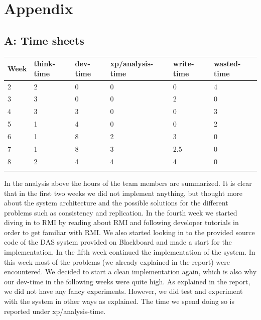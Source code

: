 \section{Appendix}

\subsection{A: Time sheets}

\begin{table}[h]
\begin{tabular}{llllll}
\textbf{Week} & \textbf{think-time} & \textbf{dev-time} & \textbf{xp/analysis-time} & \textbf{write-time} & \textbf{wasted-time} \\ \hline
2             & 2                   & 0                 & 0                         & 0                   & 4                    \\
3             & 3                   & 0                 & 0                         & 2                   & 0                    \\
4             & 3                   & 3                 & 0                         & 0                   & 3                    \\
5             & 1                   & 4                 & 0                         & 0                   & 2                    \\
6             & 1                   & 8                 & 2                         & 3                   & 0                    \\
7             & 1                   & 8                 & 3                         & 2.5                 & 0                    \\
8             & 2                   & 4                 & 4                         & 4                   & 0                    \\
              &                     &                   &                           &                     &                     
\end{tabular}
\end{table}

In the analysis above the hours of the team members are summarized. 
It is clear that in the first two weeks we did not implement anything, but thought more about the system architecture and the possible solutions for the different problems such as consistency and replication.
In the fourth week we started diving in to RMI by reading about RMI and following developer tutorials in order to get familiar with  RMI.
We also started looking in to the provided source code of the DAS system provided on Blackboard and made a start for the implementation.
In the fifth week continued the implementation of the system.
In this week most of the problems (we already explained in the report) were encountered. 
We decided to start a clean implementation again, which is also why our dev-time in the following weeks were quite high.
As explained in the report, we did not have any fancy experiments. 
However, we did test and experiment with the system in other ways as explained.
The time we spend doing so is reported under xp/analysis-time.

